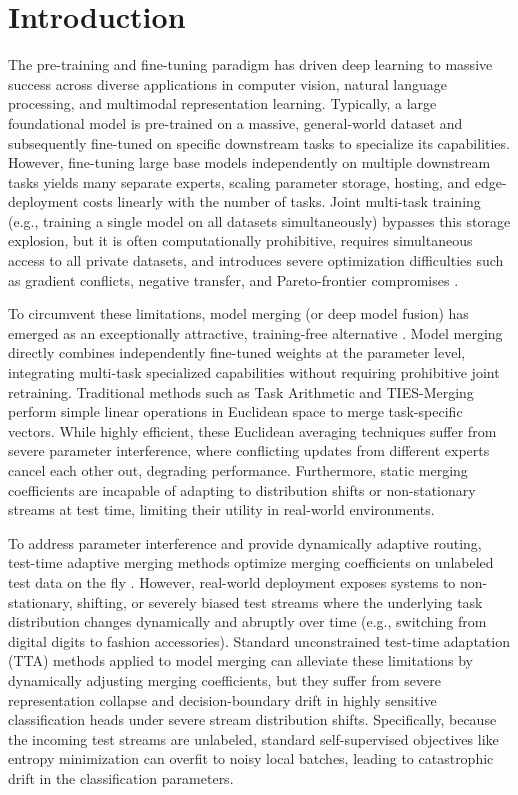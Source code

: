 \documentclass{article}
\theoremstyle{plain}
\theoremstyle{definition}
\theoremstyle{remark}
\begin{document}
\section{Introduction}
\label{sec:intro}
The pre-training and fine-tuning paradigm has driven deep learning to massive success across diverse applications in computer vision, natural language processing, and multimodal representation learning. Typically, a large foundational model is pre-trained on a massive, general-world dataset and subsequently fine-tuned on specific downstream tasks to specialize its capabilities. However, fine-tuning large base models independently on multiple downstream tasks yields many separate experts, scaling parameter storage, hosting, and edge-deployment costs linearly with the number of tasks. Joint multi-task training (e.g., training a single model on all datasets simultaneously) bypasses this storage explosion, but it is often computationally prohibitive, requires simultaneous access to all private datasets, and introduces severe optimization difficulties such as gradient conflicts, negative transfer, and Pareto-frontier compromises \cite{yadav2023ties,chen2024deep}.

To circumvent these limitations, model merging (or deep model fusion) has emerged as an exceptionally attractive, training-free alternative \cite{wortsman2022model,ilharco2023editing,yang2024bridging,amine2019merging,wang2024dynamic}. Model merging directly combines independently fine-tuned weights at the parameter level, integrating multi-task specialized capabilities without requiring prohibitive joint retraining. Traditional methods such as Task Arithmetic \cite{ilharco2023editing} and TIES-Merging \cite{yadav2023ties} perform simple linear operations in Euclidean space to merge task-specific vectors. While highly efficient, these Euclidean averaging techniques suffer from severe parameter interference, where conflicting updates from different experts cancel each other out, degrading performance. Furthermore, static merging coefficients are incapable of adapting to distribution shifts or non-stationary streams at test time, limiting their utility in real-world environments.

To address parameter interference and provide dynamically adaptive routing, test-time adaptive merging methods optimize merging coefficients on unlabeled test data on the fly \cite{sata2026convex,s2c2026teacher,ewc2026elastic}. However, real-world deployment exposes systems to non-stationary, shifting, or severely biased test streams where the underlying task distribution changes dynamically and abruptly over time (e.g., switching from digital digits to fashion accessories). Standard unconstrained test-time adaptation (TTA) methods applied to model merging can alleviate these limitations by dynamically adjusting merging coefficients, but they suffer from severe representation collapse and decision-boundary drift in highly sensitive classification heads under severe stream distribution shifts. Specifically, because the incoming test streams are unlabeled, standard self-supervised objectives like entropy minimization can overfit to noisy local batches, leading to catastrophic drift in the classification parameters.
\end{document}
